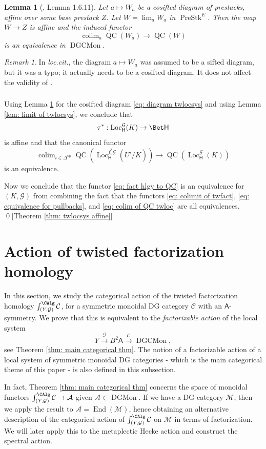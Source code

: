 \documentclass[10pt]{amsart}
\newcommand{\sssec}{\subsubsection}
\newtheorem{lemma}[subsubsection]{Lemma}
\theoremstyle{remark}
\newtheorem{rmk}[subsubsection]{Remark}
\newcommand{\on}{\operatorname}
\newcommand{\cA}{\mathcal{A}}
\newcommand{\cC}{\mathcal{C}}
\newcommand{\cG}{\mathcal{G}}
\newcommand{\cM}{\mathcal{M}}
\newcommand{\DGCatMon}{\on{DGMon}}
\newcommand{\DGCatSymMon}{\on{DGCMon}}
\newcommand{\QC}{\on{QC}}
\newcommand{\Loc}{\on{Loc}}
\newcommand{\PreStk}{\on{PreStk}}
\DeclareMathOperator{\End}{End}
\DeclareMathOperator{\op}{op}
\DeclareMathOperator{\colim}{colim}
\newcommand{\sffH}{\mathsf{H}}
\newcommand{\sfA}{\mathsf{A}}
\begin{document}
\begin{lemma}[\cite{GKRV}, Lemma 1.6.11]\label{lem: cosifted limit and QC}
    Let $a\mapsto W_a$ be a cosifted diagram of prestacks, affine over some base prestack $Z$. Let $W=\lim_a W_a$ in $\PreStk^E$. Then the map $W\rightarrow Z$ is affine and the induced functor
    \[\colim_a \QC(W_a)\rightarrow \QC(W)\]
    is an equivalence in $\DGCatSymMon$.
\end{lemma}
\begin{rmk}
    In \emph{loc.cit.}, the diagram $a\mapsto W_a$ was assumed to be a sifted diagram, but it was a typo; it actually needs to be a cosifted diagram. It does not affect the validity of \cite[Theorem 1.6.8]{GKRV}.
\end{rmk}

\sssec{}
Using Lemma \ref{lem: cosifted limit and QC} for the cosifted diagram \eqref{eq: diagram twlocsys} and using Lemma \ref{lem: limit of twlocsys}, we conclude that
\[\tau^*:\Loc^{\cG}_\sffH(K)\rightarrow \Bet \sffH\]
is affine and that the canonical functor
\begin{equation}\label{eq: colim of QC twloc}
    \colim_{i\in\Delta^{\op}}\QC(\Loc^{f^*_i\cG}_\sffH (U^i/K))\rightarrow \QC(\Loc^{\cG}_\sffH(K))
\end{equation}
is an equivalence.
\medskip

Now we conclude that the functor \eqref{eq: fact hlgy to QC} is an equivalence for $(K,\cG)$ from combining the fact that the functors \eqref{eq: colimit of twfact}, \eqref{eq: equivalence for pullbacks}, and \eqref{eq: colim of QC twloc} are all equivalences. \qed[Theorem \ref{thm: twlocsys affine}]


\section{Action of twisted factorization homology}\label{sec: action of twisted fact hlgy}
In this section, we study the categorical action of the twisted factorization homology $\int^{\CAlg}_{(Y,\cG)}\cC$, for a symmetric monoidal DG category $\cC$ with an $\mathsf{A}$-symmetry. We prove that this is equivalent to the \emph{factorizable action} of the local system
\[Y\xrightarrow{\cG}B^2\sfA\xrightarrow{\cC}\DGCatSymMon,\]
see Theorem \ref{thm: main categorical thm}.
The notion of a factorizable action of a local system of symmetric monoidal DG categories - which is the main categorical theme of this paper - is also defined in this subsection.
\medskip

In fact, Theorem \ref{thm: main categorical thm} concerns the space of monoidal functors $\int^{\CAlg}_{(Y,\cG)}\cC\rightarrow \cA$ given $\cA\in\DGCatMon$.
 If we have a DG category $\cM$, then we apply the result to $\cA=\End(\cM)$, hence obtaining an alternative description of the categorical action of $\int^{\CAlg}_{(Y,\cG)}\cC$ on $\cM$ in terms of factorization. We will later apply this to the metaplectic Hecke action and construct the spectral action.
\end{document}
